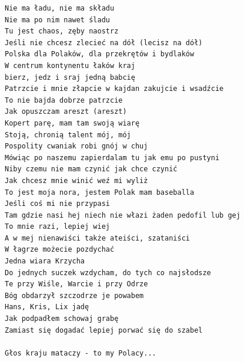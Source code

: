 \documentclass[12pt]{article}
\begin{document}
\begin{verbatim}
Nie ma ładu, nie ma składu
Nie ma po nim nawet śladu
Tu jest chaos, zęby naostrz
Jeśli nie chcesz zlecieć na dół (lecisz na dół)
Polska dla Polaków, dla przekrętów i bydlaków
W centrum kontynentu łaków kraj
bierz, jedz i sraj jedną babcię
Patrzcie i mnie złapcie w kajdan zakujcie i wsadźcie
To nie bajda dobrze patrzcie
Jak opuszczam areszt (areszt)
Kopert parę, mam tam swoją wiarę
Stoją, chronią talent mój, mój
Pospolity cwaniak robi gnój w chuj
Mówiąc po naszemu zapierdalam tu jak emu po pustyni
Niby czemu nie mam czynić jak chce czynić
Jak chcesz mnie winić weź mi wyliż
To jest moja nora, jestem Polak mam baseballa
Jeśli coś mi nie przypasi
Tam gdzie nasi hej niech nie włazi żaden pedofil lub gej
To mnie razi, lepiej wiej
A w mej nienawiści także ateiści, szataniści
W łagrze możecie pozdychać
Jedna wiara Krzycha
Do jednych suczek wzdycham, do tych co najsłodsze
Te przy Wiśle, Warcie i przy Odrze
Bóg obdarzył szczodrze je powabem
Hans, Kris, Lix jadę
Jak podpadłem schowaj grabę
Zamiast się dogadać lepiej porwać się do szabel

Głos kraju mataczy - to my Polacy...
\end{verbatim}
\clearpage
\end{document}
